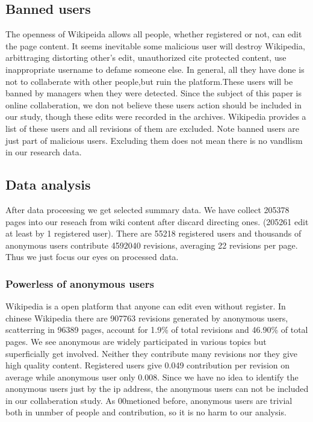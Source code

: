 \documentclass{elsarticle}
\begin{document}
\subsection{Banned users}
\label{sec:banned-users}
The openness of Wikipeida allows all people, whether registered or
not, can edit the page content. It seems inevitable some malicious
user will destroy Wikipedia, arbittraging distorting other's edit,
unauthorized cite protected content, use inappropriate username to
defame someone else. In general, all they have done is not to
collaberate with other people,but ruin the platform.These users will
be banned by managers when they were detected. Since the subject of
this paper is online collaberation, we don not believe these users
action should be included in our study, though these edits were
recorded in the archives. Wikipedia provides a list of these users\cite{badnames}\cite{bannedwikipedians} and
all revisions of them are excluded. Note banned users are just part of
malicious users. Excluding them does not mean there is no vandlism in
our research data. 

\subsection{Data analysis}
\label{sec:data-analysis}

After data proceesing we get selected summary data. We have collect 205378
pages into our reseach from wiki content after discard directing
ones. (205261 edit at least by 1 registered user). There are 55218 registered users and thousands of anonymous
users contribute 4592040 revisions, averaging  22 revisions per
page. Thus we just focus our eyes on processed data.

\subsubsection{Powerless of anonymous users}
\label{sec:powerl-anonym-users}
Wikipedia is  a open platform that anyone can edit even without
register. In chinese Wikipedia there are 907763  revisions generated
by anonymous users, scatterring in 96389 pages, account for 1.9\% of
total revisions and 46.90\% of total pages. We see anonymous are
widely participated in various topics but  superficially get
involved. Neither they contribute many revisions nor they give high
quality content. Registered users  give 0.049 contribution per
revision on average while anonymous user only 0.008.  Since we have no
idea to identify the anonymous users just by the ip address, the
anonymous users can not be included in our collaberation study. As
00metioned before, anonymous users are trivial both in unmber of people
and contribution, so it is no harm to our analysis. 
\end{document}
